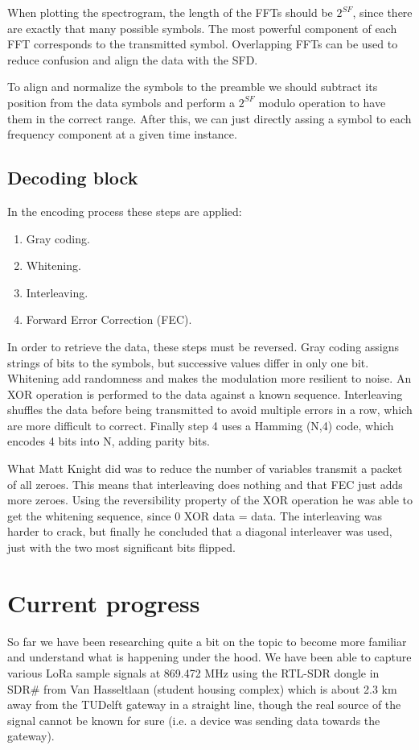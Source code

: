 \documentclass{icmmcm}
\begin{document}
When plotting the spectrogram, the length of the FFTs should be $2^{SF}$, since there are exactly that many possible symbols. The most powerful component of each FFT corresponds to the transmitted symbol. Overlapping FFTs can be used to reduce confusion and align the data with the SFD.

To align and normalize the symbols to the preamble we should subtract its position from the data symbols and perform a $2^{SF}$ modulo operation to have them in the correct range. After this, we can just directly assing a symbol to each frequency component at a given time instance.

\subsection{Decoding block}
In the encoding process these steps are applied:
\begin{enumerate}
    \item Gray coding.
    \item Whitening.
    \item Interleaving.
    \item Forward Error Correction (FEC).
\end{enumerate}
In order to retrieve the data, these steps must be reversed. Gray coding assigns strings of bits to the symbols, but successive values differ in only one bit. Whitening add randomness and makes the modulation more resilient to noise. An XOR operation is performed to the data against a known sequence. Interleaving shuffles the data before being transmitted to avoid multiple errors in a row, which are more difficult to correct. Finally step 4 uses a Hamming (N,4) code, which encodes 4 bits into N, adding parity bits.

What Matt Knight did was to reduce the number of variables transmit a packet of all zeroes. This means that interleaving does nothing and that FEC just adds more zeroes. Using the reversibility property of the XOR operation he was able to get the whitening sequence, since 0 XOR data = data. The interleaving was harder to crack, but finally he concluded that a diagonal interleaver was used, just with the two most significant bits flipped.

\section{Current progress}
So far we have been researching quite a bit on the topic to become more familiar and understand what is happening under the hood. We have been able to capture various LoRa sample signals at 869.472 MHz using the RTL-SDR dongle in SDR\# from Van Hasseltlaan (student housing complex) which is about 2.3 km away from the TUDelft gateway in a straight line, though the real source of the signal cannot be known for sure (i.e. a device was sending data towards the gateway).
\end{document}
